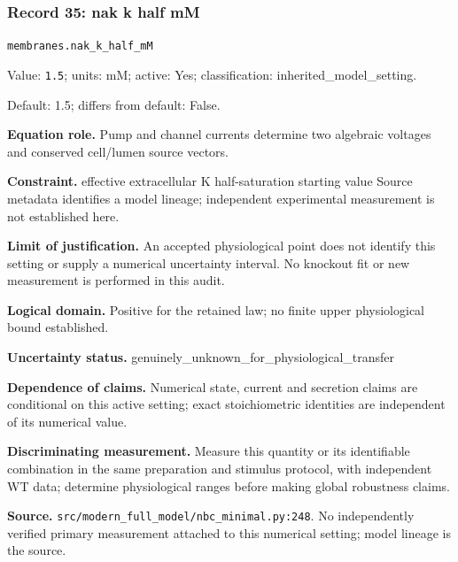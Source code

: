 \subsubsection*{Record 35: nak k half mM}
{\small \nolinkurl{membranes.nak_k_half_mM}\par

Value: \texttt{1.5}; units: mM; active: Yes; classification: inherited\_model\_setting.\par

Default: 1.5; differs from default: False.\par

\textbf{Equation role.} Pump and channel currents determine two algebraic voltages and conserved cell/lumen source vectors.\par

\textbf{Constraint.} effective extracellular K half-saturation starting value Source metadata identifies a model lineage; independent experimental measurement is not established here.\par

\textbf{Limit of justification.} An accepted physiological point does not identify this setting or supply a numerical uncertainty interval. No knockout fit or new measurement is performed in this audit.\par

\textbf{Logical domain.} Positive for the retained law; no finite upper physiological bound established.\par

\textbf{Uncertainty status.} genuinely\_unknown\_for\_physiological\_transfer\par

\textbf{Dependence of claims.} Numerical state, current and secretion claims are conditional on this active setting; exact stoichiometric identities are independent of its numerical value.\par

\textbf{Discriminating measurement.} Measure this quantity or its identifiable combination in the same preparation and stimulus protocol, with independent WT data; determine physiological ranges before making global robustness claims.\par

\textbf{Source.} \nolinkurl{src/modern_full_model/nbc_minimal.py:248}. No independently verified primary measurement attached to this numerical setting; model lineage is the source.\par}

